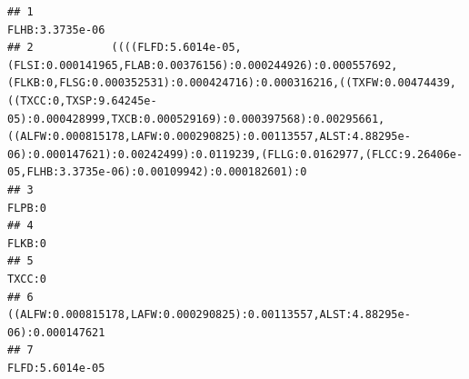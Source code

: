 \documentclass[]{article}
\begin{document}
\begin{verbatim}
## 1                                                                                                                                                                                                                                                                                                                                                                                                                     FLHB:3.3735e-06
## 2            ((((FLFD:5.6014e-05,(FLSI:0.000141965,FLAB:0.00376156):0.000244926):0.000557692,(FLKB:0,FLSG:0.000352531):0.000424716):0.000316216,((TXFW:0.00474439,((TXCC:0,TXSP:9.64245e-05):0.000428999,TXCB:0.000529169):0.000397568):0.00295661,((ALFW:0.000815178,LAFW:0.000290825):0.00113557,ALST:4.88295e-06):0.000147621):0.00242499):0.0119239,(FLLG:0.0162977,(FLCC:9.26406e-05,FLHB:3.3735e-06):0.00109942):0.000182601):0
## 3                                                                                                                                                                                                                                                                                                                                                                                                                              FLPB:0
## 4                                                                                                                                                                                                                                                                                                                                                                                                                              FLKB:0
## 5                                                                                                                                                                                                                                                                                                                                                                                                                              TXCC:0
## 6                                                                                                                                                                                                                                                                                                                                                       ((ALFW:0.000815178,LAFW:0.000290825):0.00113557,ALST:4.88295e-06):0.000147621
## 7                                                                                                                                                                                                                                                                                                                                                                                                                     FLFD:5.6014e-05

\end{verbatim}
\end{document}

